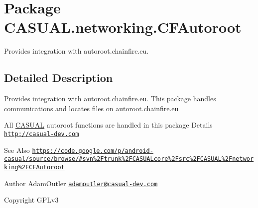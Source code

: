 \hypertarget{namespace_c_a_s_u_a_l_1_1networking_1_1_c_f_autoroot}{\section{Package C\-A\-S\-U\-A\-L.\-networking.\-C\-F\-Autoroot}
\label{namespace_c_a_s_u_a_l_1_1networking_1_1_c_f_autoroot}
}


Provides integration with autoroot.\-chainfire.\-eu.  




\subsection{Detailed Description}
Provides integration with autoroot.\-chainfire.\-eu. This package handles communications and locates files on autoroot.\-chainfire.\-eu

All \hyperlink{namespace_c_a_s_u_a_l}{C\-A\-S\-U\-A\-L} autoroot functions are handled in this package Details \href{http://casual-dev.com}{\tt http\-://casual-\/dev.\-com} \begin{DoxySeeAlso}{See Also}
\href{https://code.google.com/p/android-casual/source/browse/#svn%2Ftrunk%2FCASUALcore%2Fsrc%2FCASUAL%2Fnetworking%2FCFAutoroot}{\tt https\-://code.\-google.\-com/p/android-\/casual/source/browse/\#svn\%2\-Ftrunk\%2\-F\-C\-A\-S\-U\-A\-Lcore\%2\-Fsrc\%2\-F\-C\-A\-S\-U\-A\-L\%2\-Fnetworking\%2\-F\-C\-F\-Autoroot} 
\end{DoxySeeAlso}
\begin{DoxyAuthor}{Author}
Adam\-Outler \href{mailto:adamoutler@casual-dev.com}{\tt adamoutler@casual-\/dev.\-com} 
\end{DoxyAuthor}
\begin{DoxyCopyright}{Copyright}
G\-P\-Lv3 
\end{DoxyCopyright}
